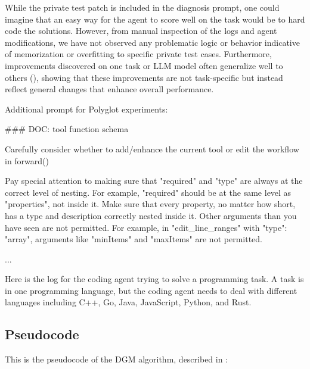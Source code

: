 \documentclass{article}
\begin{document}
While the private test patch is included in the diagnosis prompt, one could imagine that an easy way for the agent to score well on the task would be to hard code the solutions. However, from manual inspection of the logs and agent modifications, we have not observed any problematic logic or behavior indicative of memorization or overfitting to specific private test cases. Furthermore, improvements discovered on one task or LLM model often generalize well to others (), showing that these improvements are not task-specific but instead reflect general changes that enhance overall performance.

Additional prompt for Polyglot experiments:

\begin{tcolorbox}[breakable,colback=orange!5!white, colframe=orange!80!black, title=Additional Prompt for o3-mini Tool Use and Polyglot]
\scriptsize
\begin{MyVerbatim}
### DOC: tool function schema

Carefully consider whether to add/enhance the current tool or edit the workflow in forward()

Pay special attention to making sure that "required" and "type" are always at the correct level of nesting. For example, "required" should be at the same level as "properties", not inside it.
Make sure that every property, no matter how short, has a type and description correctly nested inside it.
Other arguments than you have seen are not permitted. For example, in "edit_line_ranges" with "type": "array", arguments like "minItems" and "maxItems" are not permitted.

...

Here is the log for the coding agent trying to solve a programming task. 
A task is in one programming language, but the coding agent needs to deal with different languages including C++, Go, Java, JavaScript, Python, and Rust.
\end{MyVerbatim}
\end{tcolorbox}


\subsection{Pseudocode}
\label{app:pseudocode}

This is the pseudocode of the DGM algorithm, described in :
\end{document}
